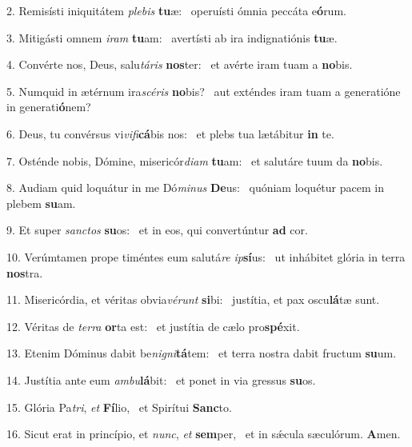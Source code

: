 2. Remisísti iniquitátem \textit{ple}\textit{bis} \textbf{tu}æ: \ast\  operuísti ómnia peccáta e\textbf{ó}rum.\

3. Mitigásti omnem \textit{i}\textit{ram} \textbf{tu}am: \ast\  avertísti ab ira indignatiónis \textbf{tu}æ.\

4. Convérte nos, Deus, salu\textit{tá}\textit{ris} \textbf{nos}ter: \ast\  et avérte iram tuam a \textbf{no}bis.\

5. Numquid in ætérnum ira\textit{scé}\textit{ris} \textbf{no}bis? \ast\  aut exténdes iram tuam a generatióne in generati\textbf{ó}nem?\

6. Deus, tu convérsus vi\textit{vi}\textit{fi}\textbf{cá}bis nos: \ast\  et plebs tua lætábitur \textbf{in} te.\

7. Osténde nobis, Dómine, misericór\textit{di}\textit{am} \textbf{tu}am: \ast\  et salutáre tuum da \textbf{no}bis.\

8. Audiam quid loquátur in me Dó\textit{mi}\textit{nus} \textbf{De}us: \ast\  quóniam loquétur pacem in plebem \textbf{su}am.\

9. Et super \textit{sanc}\textit{tos} \textbf{su}os: \ast\  et in eos, qui convertúntur \textbf{ad} cor.\

10. Verúmtamen prope timéntes eum salutá\textit{re} \textit{ip}\textbf{sí}us: \ast\  ut inhábitet glória in terra \textbf{nos}tra.\

11. Misericórdia, et véritas obvia\textit{vé}\textit{runt} \textbf{si}bi: \ast\  justítia, et pax oscu\textbf{lá}tæ sunt.\

12. Véritas de \textit{ter}\textit{ra} \textbf{or}ta est: \ast\  et justítia de cælo pro\textbf{spé}xit.\

13. Etenim Dóminus dabit be\textit{ni}\textit{gni}\textbf{tá}tem: \ast\  et terra nostra dabit fructum \textbf{su}um.\

14. Justítia ante eum \textit{am}\textit{bu}\textbf{lá}bit: \ast\  et ponet in via gressus \textbf{su}os.\

15. Glória Pa\textit{tri}, \textit{et} \textbf{Fí}lio, \ast\  et Spirítui \textbf{Sanc}to.\

16. Sicut erat in princípio, et \textit{nunc}, \textit{et} \textbf{sem}per, \ast\  et in sǽcula sæculórum. \textbf{A}men.\

